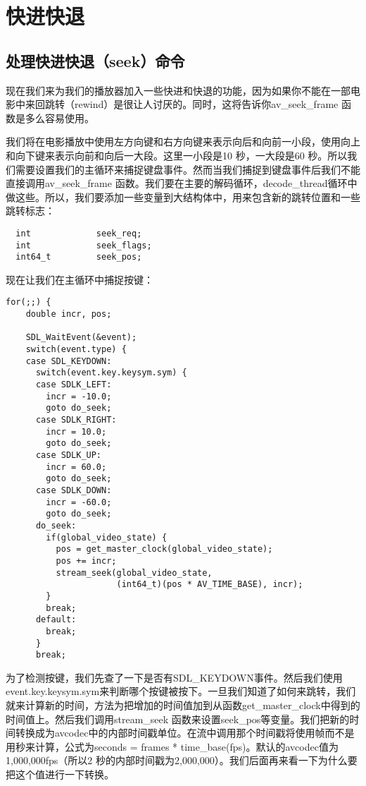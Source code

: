 ﻿\chapter{快进快退}
\label{ch7}
\section{处理快进快退（seek）命令}
现在我们来为我们的播放器加入一些快进和快退的功能，因为如果你不能在一部电影中来回跳转（rewind）是很让人讨厌的。同时，这将告诉你av_seek_frame 函数是多么容易使用。

我们将在电影播放中使用左方向键和右方向键来表示向后和向前一小段，使用向上和向下键来表示向前和向后一大段。这里一小段是10 秒，一大段是60 秒。所以我们需要设置我们的主循环来捕捉键盘事件。然而当我们捕捉到键盘事件后我们不能直接调用av_seek_frame 函数。我们要在主要的解码循环，decode_thread循环中做这些。所以，我们要添加一些变量到大结构体中，用来包含新的跳转位置和一些跳转标志：
\begin{lstlisting}
  int             seek_req;
  int             seek_flags;
  int64_t         seek_pos;
\end{lstlisting}

现在让我们在主循环中捕捉按键：

\begin{lstlisting}
for(;;) {
    double incr, pos;

    SDL_WaitEvent(&event);
    switch(event.type) {
    case SDL_KEYDOWN:
      switch(event.key.keysym.sym) {
      case SDLK_LEFT:
		incr = -10.0;
		goto do_seek;
      case SDLK_RIGHT:
		incr = 10.0;
		goto do_seek;
      case SDLK_UP:
		incr = 60.0;
		goto do_seek;
      case SDLK_DOWN:
		incr = -60.0;
		goto do_seek;
      do_seek:
		if(global_video_state) {
		  pos = get_master_clock(global_video_state);
		  pos += incr;
		  stream_seek(global_video_state,
                      (int64_t)(pos * AV_TIME_BASE), incr);
		}
		break;
      default:
		break;
	  }
      break;
\end{lstlisting}

为了检测按键，我们先查了一下是否有SDL_KEYDOWN事件。然后我们使用event.key.keysym.sym来判断哪个按键被按下。一旦我们知道了如何来跳转，我们就来计算新的时间，方法为把增加的时间值加到从函数get_master_clock中得到的时间值上。然后我们调用stream_seek 函数来设置seek_pos等变量。我们把新的时间转换成为avcodec中的内部时间戳单位。在流中调用那个时间戳将使用帧而不是用秒来计算，公式为seconds = frames * time_base(fps)。默认的avcodec值为1,000,000fps（所以2 秒的内部时间戳为2,000,000）。我们后面再来看一下为什么要把这个值进行一下转换。

